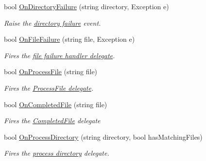 \begin{DoxyCompactItemize}
\item 
bool \hyperlink{class_i_c_sharp_code_1_1_sharp_zip_lib_1_1_zip_1_1_fast_zip_events_ae04e152690da472b63336c8640f1d5db}{On\+Directory\+Failure} (string directory, Exception e)
\begin{DoxyCompactList}\small\item\em Raise the \hyperlink{class_i_c_sharp_code_1_1_sharp_zip_lib_1_1_zip_1_1_fast_zip_events_a33d748361c7dcfd4c40518b99a689979}{directory failure} event. \end{DoxyCompactList}\item 
bool \hyperlink{class_i_c_sharp_code_1_1_sharp_zip_lib_1_1_zip_1_1_fast_zip_events_a20ff661e5c72d8a07cbc062ee0851c46}{On\+File\+Failure} (string file, Exception e)
\begin{DoxyCompactList}\small\item\em Fires the \hyperlink{class_i_c_sharp_code_1_1_sharp_zip_lib_1_1_zip_1_1_fast_zip_events_ae1451c8ef2694b3606c436a6769b917d}{file failure handler delegate}. \end{DoxyCompactList}\item 
bool \hyperlink{class_i_c_sharp_code_1_1_sharp_zip_lib_1_1_zip_1_1_fast_zip_events_a82c21c7003b64f14420145dd4f41db46}{On\+Process\+File} (string file)
\begin{DoxyCompactList}\small\item\em Fires the \hyperlink{class_i_c_sharp_code_1_1_sharp_zip_lib_1_1_zip_1_1_fast_zip_events_a3dd9d1b4b6453229cc18b2899ab43788}{Process\+File delegate}. \end{DoxyCompactList}\item 
bool \hyperlink{class_i_c_sharp_code_1_1_sharp_zip_lib_1_1_zip_1_1_fast_zip_events_af8ca877e79d18f08f51abb7323397229}{On\+Completed\+File} (string file)
\begin{DoxyCompactList}\small\item\em Fires the \hyperlink{class_i_c_sharp_code_1_1_sharp_zip_lib_1_1_zip_1_1_fast_zip_events_acd15d699c15334063f1500ff5f0633cd}{Completed\+File} delegate \end{DoxyCompactList}\item 
bool \hyperlink{class_i_c_sharp_code_1_1_sharp_zip_lib_1_1_zip_1_1_fast_zip_events_ac662ee939e011224cb3cd20dec9e5e10}{On\+Process\+Directory} (string directory, bool has\+Matching\+Files)
\begin{DoxyCompactList}\small\item\em Fires the \hyperlink{class_i_c_sharp_code_1_1_sharp_zip_lib_1_1_zip_1_1_fast_zip_events_a159a89c479511187e4c989ae149796af}{process directory} delegate. \end{DoxyCompactList}\end{DoxyCompactItemize}
